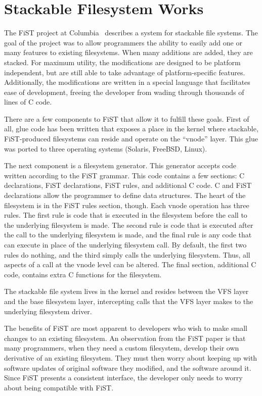 \section{Stackable Filesystem Works}

The FiST project at Columbia~\cite{zadok00fist} describes a system for
stackable file systems. The goal of the project was to allow
programmers the ability to easily add one or many features to existing
filesystems. When many additions are added, they are stacked. For
maximum utility, the modifications are designed to be platform
independent, but are still able to take advantage of platform-specific
features. Additionally, the modifications are written in a special
language that facilitates ease of development, freeing the developer
from wading through thousands of lines of C code.

There are a few components to FiST that allow it to fulfill these
goals. First of all, glue code has been written that exposes a place
in the kernel where stackable, FiST-produced filesystems can reside
and operate on the ``vnode'' layer. This glue was ported to three
operating systems (Solaris, FreeBSD, Linux).

The next component is a filesystem generator. This generator accepts
code written according to the FiST grammar. This code contains a few
sections: C declarations, FiST declarations, FiST rules, and
additional C code. C and FiST declarations allow the programmer to
define data structures. The heart of the filesystem is in the FiST
rules section, though. Each vnode operation has three rules. The first
rule is code that is executed in the filesystem before the call to the
underlying filesystem is made. The second rule is code that is
executed after the call to the underlying filesystem is made, and the
final rule is any code that can execute in place of the underlying
filesystem call. By default, the first two rules do nothing, and the
third simply calls the underlying filesystem. Thus, all aspects of a
call at the vnode level can be altered. The final section, additional
C code, contains extra C functions for the filesystem.

The stackable file system lives in the kernel and resides between the
VFS layer and the base filesystem layer, intercepting calls that the
VFS layer makes to the underlying filesystem driver.

The benefits of FiST are most apparent to developers who wish to make
small changes to an existing filesystem. An observation from the FiST
paper is that many programmers, when they need a custom filesystem,
develop their own derivative of an existing filesystem. They must then
worry about keeping up with software updates of original software they
modified, and the software around it. Since FiST presents a consistent
interface, the developer only needs to worry about being compatible
with FiST.

